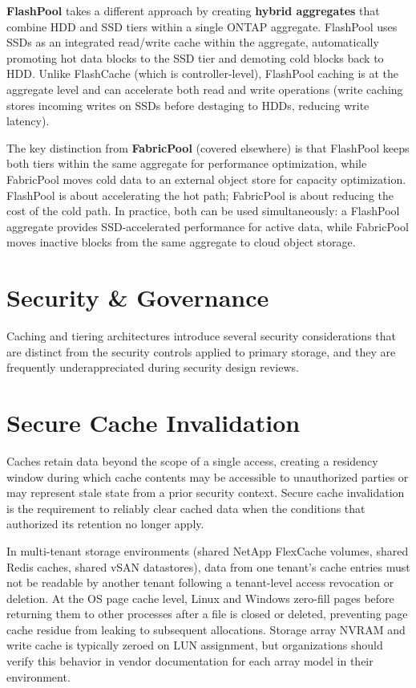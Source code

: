 \textbf{FlashPool} takes a different approach by creating \textbf{hybrid aggregates} that combine HDD and SSD tiers within a single ONTAP aggregate. FlashPool uses SSDs as an integrated read/write cache within the aggregate, automatically promoting hot data blocks to the SSD tier and demoting cold blocks back to HDD. Unlike FlashCache (which is controller-level), FlashPool caching is at the aggregate level and can accelerate both read and write operations (write caching stores incoming writes on SSDs before destaging to HDDs, reducing write latency).

The key distinction from \textbf{FabricPool} (covered elsewhere) is that FlashPool keeps both tiers within the same aggregate for performance optimization, while FabricPool moves cold data to an external object store for capacity optimization. FlashPool is about accelerating the hot path; FabricPool is about reducing the cost of the cold path. In practice, both can be used simultaneously: a FlashPool aggregate provides SSD-accelerated performance for active data, while FabricPool moves inactive blocks from the same aggregate to cloud object storage.


\section{Security \& Governance}
Caching and tiering architectures introduce several security considerations that are distinct from the security controls applied to primary storage, and they are frequently underappreciated during security design reviews.

\section{Secure Cache Invalidation}
Caches retain data beyond the scope of a single access, creating a residency window during which cache contents may be accessible to unauthorized parties or may represent stale state from a prior security context. Secure cache invalidation is the requirement to reliably clear cached data when the conditions that authorized its retention no longer apply.

In multi-tenant storage environments (shared NetApp FlexCache volumes, shared Redis caches, shared vSAN datastores), data from one tenant's cache entries must not be readable by another tenant following a tenant-level access revocation or deletion. At the OS page cache level, Linux and Windows zero-fill pages before returning them to other processes after a file is closed or deleted, preventing page cache residue from leaking to subsequent allocations. Storage array NVRAM and write cache is typically zeroed on LUN assignment, but organizations should verify this behavior in vendor documentation for each array model in their environment.

